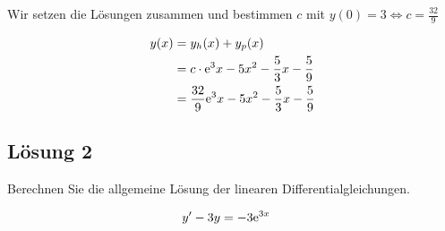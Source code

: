 \documentclass[main.tex]{subfiles}
\begin{document}
Wir setzen die Lösungen zusammen und bestimmen $c$ mit $y(0) = 3 \Leftrightarrow c = \frac{32}{9}$

\begin{align*}
    y(x) &= y_h(x) + y_p(x) \\
         &= c \cdot \mathrm{e}^3x -5x^2 -\frac{5}{3} x - \frac{5}{9} \\
         &= \frac{32}{9} \mathrm{e}^3x -5x^2 -\frac{5}{3} x - \frac{5}{9} \\
\end{align*}

\subsection{Lösung 2}

Berechnen Sie die allgemeine Lösung der linearen Differentialgleichungen.

\begin{align*}
    y'-3y &= -3\mathrm{e}^{3x}
\end{align*}
\end{document}
